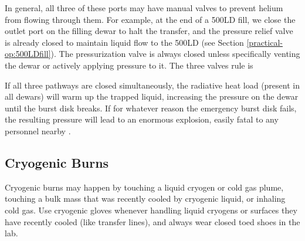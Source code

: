 In general, all three of these ports may have manual valves to prevent helium from flowing through them.  For example, at the end of a 500LD fill, we close the outlet port on the filling dewar to halt the transfer, and the pressure relief valve is already closed to maintain liquid flow to the 500LD (see Section \ref{practical-op:500LDfill}).  The pressurization valve is always closed unless specifically venting the dewar or actively applying pressure to it.  The three valves rule is


If all three pathways are closed simultaneously, the radiative heat load (present in all dewars) will warm up the trapped liquid, increasing the pressure on the dewar until the burst disk breaks.  If for whatever reason the emergency burst disk fails, the resulting pressure will lead to an enormous explosion, easily fatal to any personnel nearby \cite{lnexplosion}. 

\subsection{Cryogenic Burns}
Cryogenic burns may happen by touching a liquid cryogen or cold gas plume, touching a bulk mass that was recently cooled by cryogenic liquid, or inhaling cold gas.  Use cryogenic gloves whenever handling liquid cryogens or surfaces they have recently cooled (like transfer lines), and always wear closed toed shoes in the lab.


\vspace{1cm}
\vspace{1cm}

